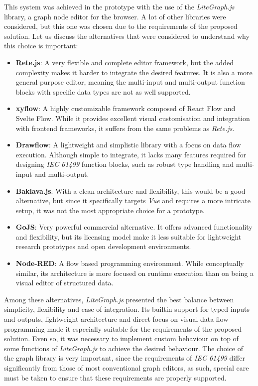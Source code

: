 
This system was achieved in the prototype with the use of the \textit{LiteGraph.js} library, a graph node editor for the browser. A lot of other libraries were considered, but this one was chosen due to the requirements of the proposed solution. Let us discuss the alternatives that were considered to understand why this choice is important:

\begin{itemize}
  \item \textbf{Rete.js}: A very flexible and complete editor framework, but the added complexity makes it harder to integrate the desired features. It is also a more general purpose editor, meaning the multi-input and multi-output function blocks with specific data types are not as well supported.
  \item \textbf{xyflow}: A highly customizable framework composed of React Flow and Svelte Flow. While it provides excellent visual customisation and integration with frontend frameworks, it suffers from the same problems as \textit{Rete.js}. %
  \item \textbf{Drawflow}: A lightweight and simplistic library with a focus on data flow execution. Although simple to integrate, it lacks many features required for designing \textit{IEC 61499} function blocks, such as robust type handling and multi-input and multi-output.
  \item \textbf{Baklava.js}: With a clean architecture and flexibility, this would be a good alternative, but since it specifically targets \textit{Vue} and requires a more intricate setup, it was not the most appropriate choice for a prototype.
  \item \textbf{GoJS}: Very powerful commercial alternative. It offers advanced functionality and flexibility, but its licensing model make it less suitable for lightweight research prototypes and open development environments.
  \item \textbf{Node-RED}: A flow based programming environment. While conceptually similar, its architecture is more focused on runtime execution than on being a visual editor of structured data.
\end{itemize}

Among these alternatives, \textit{LiteGraph.js} presented the best balance between simplicity, flexibility and ease of integration. Its builtin support for typed inputs and outputs, lightweight architecture and direct focus on visual data flow programming made it especially suitable for the requirements of the proposed solution. Even so, it was necessary to implement custom behaviour on top of some functions of \textit{LiteGraph.js} to achieve the desired behaviour. The choice of the graph library is very important, since the requirements of \textit{IEC 61499} differ significantly from those of most conventional graph editors, as such, special care must be taken to ensure that these requirements are properly supported.



